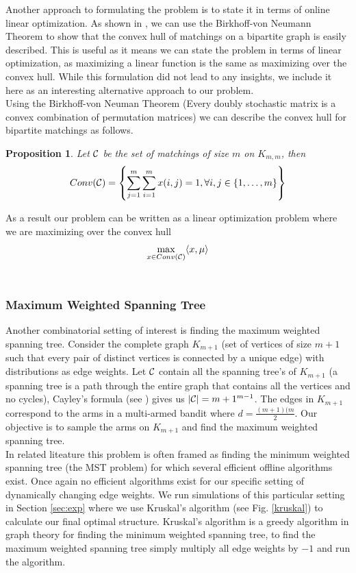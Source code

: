 \documentclass[11.75pt,oneside]{amsart}
\newtheorem{prop}[thm]{Proposition}
\begin{document}
Another approach to formulating the problem is to state it in terms of online linear optimization. As shown in \cite{Bub11}, we can use the Birkhoff-von Neumann Theorem to show that the convex hull of matchings on a bipartite graph is easily described. This is useful as it means we can state the problem in terms of linear optimization, as maximizing a linear function is the same as maximizing over the convex hull. While this formulation did not lead to any insights, we include it here as an interesting alternative approach to our problem.\\

Using the Birkhoff-von Neuman Theorem (Every doubly stochastic matrix is a convex combination of permutation matrices) we can describe the convex hull for bipartite matchings as follows.

\begin{prop} \label{prop2}
Let $\mathcal{C}$ be the set of matchings of size $m$ on $K_{m,m}$, then\\
$$ Conv(\mathcal{C}) = \left\{ \sum_{j=1}^m \sum_{i=1}^m x(i,j) = 1, \forall i,j \in \{1,\hdots,m\} \right\} $$
\end{prop}
\vspace{10pt}
As a result our problem can be written as a linear optimization problem where we are maximizing over the convex hull $$\max_{x \in Conv(\mathcal{C})} \langle x, \mu \rangle$$\\  


\subsubsection{Maximum Weighted Spanning Tree} \label{sec:maxspanalgo}
Another combinatorial setting of interest is finding the maximum weighted spanning tree. Consider the complete graph $K_{m+1}$ (set of vertices of size $m+1$ such that every pair of distinct vertices is connected by a unique edge) with distributions as edge weights. Let $\mathcal{C}$ contain all the spanning tree's of $K_{m+1}$ (a spanning tree is a path through the entire graph that contains all the vertices and no cycles), Cayley's formula (see \cite{DW01}) gives us $|\mathcal{C}| = {m+1}^{m-1}$. The edges in $K_{m+1}$ correspond to the arms in a multi-armed bandit where $d=\frac{(m+1)(m}{2}$. Our objective is to sample the arms on $K_{m+1}$ and find the maximum weighted spanning tree.\\ 

In related liteature this problem is often framed as finding the minimum weighted spanning tree (the MST problem) for which several efficient offline algorithms exist. Once again no efficient algorithms exist for our specific setting of dynamically changing edge weights. We run simulations of this particular setting in Section \ref{sec:exp} where we use Kruskal's algorithm (see Fig. \ref{kruskal}) to calculate our final optimal structure. Kruskal's algorithm is a greedy algorithm in graph theory for finding the minimum weighted spanning tree, to find the maximum weighted spanning tree simply multiply all edge weights by $-1$ and run the algorithm.\\
\end{document}
